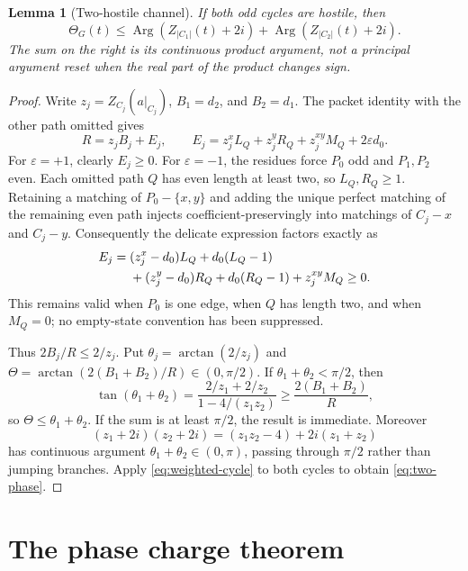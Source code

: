 \documentclass[11pt]{article}
\newtheorem{lemma}[theorem]{Lemma}
\theoremstyle{remark}
\newcommand{\Arg}{\operatorname{Arg}}
\begin{document}
\begin{lemma}[Two-hostile channel]\label{lem:two}
If both odd cycles are hostile, then
\begin{equation}\label{eq:two-phase}
 \Theta_G(t)\leq
 \Arg(Z_{|C_1|}(t)+2i)+\Arg(Z_{|C_2|}(t)+2i).
\end{equation}
The sum on the right is its continuous product argument, not a principal
argument reset when the real part of the product changes sign.
\end{lemma}

\begin{proof}
Write $z_j=Z_{C_j}(a|_{C_j})$, $B_1=d_2$, and $B_2=d_1$.  The packet identity
with the other path omitted gives
\begin{equation}\label{eq:Ej}
 R=z_jB_j+E_j,
 \qquad E_j=z_j^xL_Q+z_j^yR_Q+z_j^{xy}M_Q+2\varepsilon d_0.
\end{equation}
For $\varepsilon=+1$, clearly $E_j\geq0$.  For $\varepsilon=-1$, the residues
force $P_0$ odd and $P_1,P_2$ even.  Each omitted path $Q$ has even length at
least two, so $L_Q,R_Q\geq1$.  Retaining a matching of
$P_0-\{x,y\}$ and adding the unique perfect matching of the remaining even
path injects coefficient-preservingly into matchings of $C_j-x$ and $C_j-y$.
Consequently the delicate expression factors exactly as
\begin{align}\label{eq:zero-factor}
 E_j={}&(z_j^x-d_0)L_Q+d_0(L_Q-1)\notag\\
       &+(z_j^y-d_0)R_Q+d_0(R_Q-1)+z_j^{xy}M_Q\geq0.
\end{align}
This remains valid when $P_0$ is one edge, when $Q$ has length two, and when
$M_Q=0$; no empty-state convention has been suppressed.

Thus $2B_j/R\leq2/z_j$.  Put $\theta_j=\arctan(2/z_j)$ and
$\Theta=\arctan(2(B_1+B_2)/R)\in(0,\pi/2)$.  If
$\theta_1+\theta_2<\pi/2$, then
\[
 \tan(\theta_1+\theta_2)
 =\frac{2/z_1+2/z_2}{1-4/(z_1z_2)}
 \geq\frac{2(B_1+B_2)}R,
\]
so $\Theta\leq\theta_1+\theta_2$.  If the sum is at least $\pi/2$, the result
is immediate.  Moreover
\[
 (z_1+2i)(z_2+2i)=(z_1z_2-4)+2i(z_1+z_2)
\]
has continuous argument $\theta_1+\theta_2\in(0,\pi)$, passing through
$\pi/2$ rather than jumping branches.  Apply \eqref{eq:weighted-cycle} to
 both cycles to obtain \eqref{eq:two-phase}.
\end{proof}

\section{The phase charge theorem}
\end{document}
